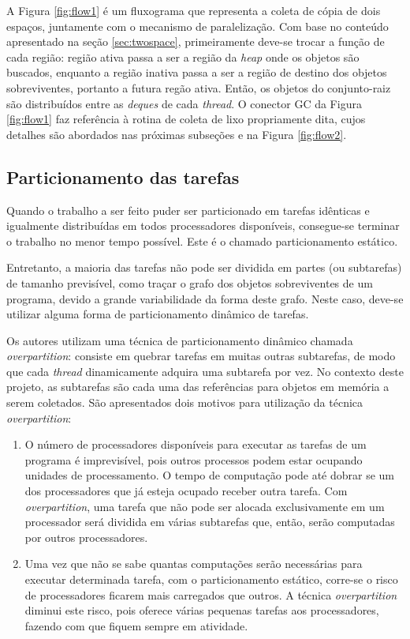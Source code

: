 \documentclass[ccc, pg2]{esinucpel}
\begin{document}
A Figura \ref{fig:flow1} é um fluxograma que representa a coleta de cópia de dois espaços, juntamente com o mecanismo de paralelização. Com base no conteúdo apresentado na seção \ref{sec:twospace}, primeiramente deve-se trocar a função de cada região: região ativa passa a ser a região da {\it heap} onde os objetos são buscados, enquanto a região inativa passa a ser a região de destino dos objetos sobreviventes, portanto a futura regão ativa. Então, os objetos do conjunto-raiz são distribuídos entre as {\it deques} de cada {\it thread}. O conector GC da Figura \ref{fig:flow1} faz referência à rotina de coleta de lixo propriamente dita, cujos detalhes são abordados nas próximas subseções e na Figura \ref{fig:flow2}.%


\subsection{Particionamento das tarefas} \label{sec:overp}
Quando o trabalho a ser feito puder ser particionado em tarefas idênticas e igualmente distribuídas em todos processadores disponíveis, consegue-se terminar o trabalho no menor tempo possível. Este é o chamado particionamento estático.

Entretanto, a maioria das tarefas não pode ser dividida em partes (ou subtarefas) de tamanho previsível, como traçar o grafo dos objetos sobreviventes de um programa, devido a grande variabilidade da forma deste grafo. Neste caso, deve-se utilizar alguma forma de particionamento dinâmico de tarefas.

Os autores utilizam uma técnica de particionamento dinâmico chamada \textit{overpartition}: consiste em quebrar tarefas em muitas outras subtarefas, de modo que cada \textit{thread} dinamicamente adquira uma subtarefa por vez. No contexto deste projeto, as subtarefas são cada uma das referências para objetos em memória a serem coletados. São apresentados dois motivos para utilização da técnica \textit{overpartition}:

\begin{enumerate}
\item O número de processadores disponíveis para executar as tarefas de um programa é imprevisível, pois outros processos podem estar ocupando unidades de processamento. O tempo de computação pode até dobrar se um dos processadores que já esteja ocupado receber outra tarefa. Com \textit{overpartition}, uma tarefa que não pode ser alocada exclusivamente em um processador será dividida em várias subtarefas que, então, serão computadas por outros processadores.

\item Uma vez que não se sabe quantas computações serão necessárias para executar determinada tarefa, com o particionamento estático, corre-se o risco de processadores ficarem mais carregados que outros. A técnica {\it overpartition} diminui este risco, pois oferece várias pequenas tarefas aos processadores, fazendo com que fiquem sempre em atividade.
\end{enumerate}
\end{document}
